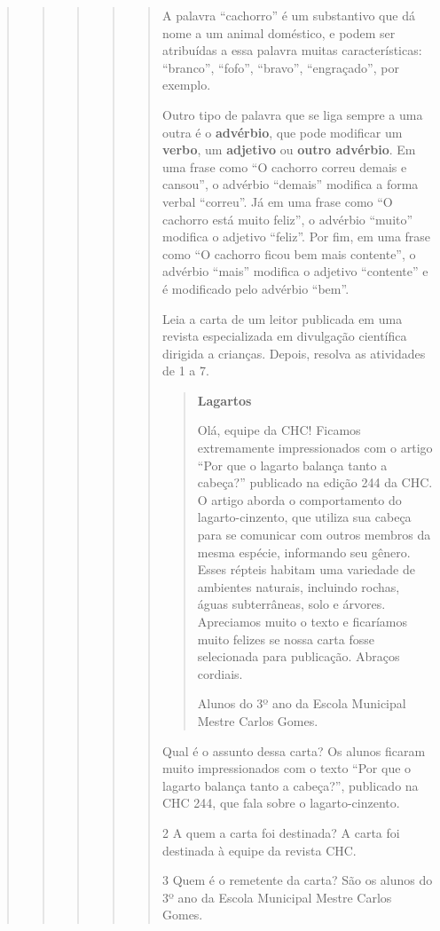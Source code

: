 \begin{boxlist}
{{\begin{quote}
\begin{quote}
\begin{quote}
{\begin{quote}
{\begin{quote}
A palavra ``cachorro'' é um substantivo que dá nome a um animal
doméstico, e podem ser atribuídas a essa palavra muitas características:
``branco'', ``fofo'', ``bravo'', ``engraçado'', por exemplo.

Outro tipo de palavra que se liga sempre a uma outra é o \textbf{advérbio},
que pode modificar um \textbf{verbo}, um \textbf{adjetivo} ou \textbf{outro
advérbio}. Em uma frase como ``O cachorro correu demais e cansou'', o advérbio
``demais'' modifica a forma verbal ``correu''. Já em uma frase como ``O cachorro
está muito feliz'', o advérbio ``muito'' modifica o adjetivo ``feliz''. Por fim,
em uma frase como ``O cachorro ficou bem mais contente'', o advérbio ``mais''
modifica o adjetivo ``contente'' e é modificado pelo advérbio ``bem''.


Leia a carta de um leitor publicada em uma revista especializada em
divulgação científica dirigida a crianças. Depois, resolva as atividades de 1 a 7.

\begin{quote}
\textbf{Lagartos}

Olá, equipe da CHC! Ficamos extremamente impressionados com o artigo ``Por que o lagarto balança tanto a cabeça?'' publicado na edição 244 da CHC. O artigo aborda o comportamento do lagarto-cinzento, que utiliza sua cabeça para se comunicar com outros membros da mesma espécie, informando seu gênero. Esses répteis habitam uma variedade de ambientes naturais, incluindo rochas, águas subterrâneas, solo e árvores. Apreciamos muito o texto e ficaríamos muito felizes se nossa carta fosse selecionada para publicação. Abraços cordiais.

Alunos do 3º ano da Escola Municipal Mestre Carlos Gomes.

\end{quote}

 Qual é o assunto dessa carta? Os alunos ficaram muito impressionados
com o texto ``Por que o lagarto balança tanto a cabeça?'', publicado na
CHC 244, que fala sobre o lagarto-cinzento.

\num{2} A quem a carta foi destinada? A carta foi destinada à equipe da revista CHC.

\num{3} Quem é o remetente da carta? São os alunos do 3º ano da Escola Municipal
  Mestre Carlos Gomes.


\end{quote}}
\end{quote}}
\end{quote}
\end{quote}
\end{quote}}}
\end{boxlist}
